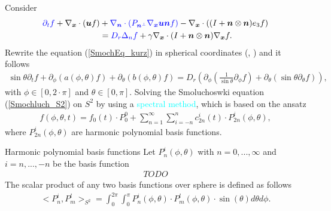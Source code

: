 \begin{frame}
	\scriptsize
	Consider 
	\begin{align}
		\textcolor{blue}{\partial_t f}+ \nabla_{\boldsymbol{x}} \cdot(\boldsymbol{u} f) & +\textcolor{blue}{\nabla_{\boldsymbol{n}} \cdot\left(P_{\boldsymbol{n}^{\perp}} \nabla_{\boldsymbol{x}} \boldsymbol{u} \boldsymbol{n} f\right)}-\nabla_{\boldsymbol{x}} \cdot\left((I+\boldsymbol{n} \otimes \boldsymbol{n}) e_3 f\right) \notag \\
		& = \textcolor{blue}{D_r \Delta_n f}+\gamma \nabla_{\boldsymbol{x}} \cdot(I+\boldsymbol{n} \otimes \boldsymbol{n}) \nabla_{\boldsymbol{x}} f. \label{SmochEq_kurz}
	\end{align}
	Rewrite the equation (\ref{SmochEq_kurz}) in spherical coordinates (\cite{zbMATH05037679}, \cite{zbMATH07295185}) and it follows
	\begin{align}
		\sin \theta \partial_t f + \partial_\phi\left(a(\phi, \theta) f\right)+\partial_\theta\left(b(\phi, \theta) f\right) = D_r \left(\partial_\phi\left(\frac{1}{\sin \theta} \partial_\phi f\right)+\partial_\theta\left(\sin \theta \partial_\theta f\right)\right), \label{Smochluch_S2}
	\end{align}
	with $\phi \in [0, 2 \cdot \pi]$ and $\theta \in [0, \pi]$.
	Solving the Smoluchoswki equation (\ref{Smochluch_S2}) on $S^2$ by using a \textcolor{cyan}{spectral method}, which is based on the ansatz
	\begin{align}
		f(\phi, \theta, t) = f_0(t) \cdot P_0^0 + \sum_{n=1}^{\infty} \sum_{i=-n}^{n} c^i_{2n}(t) \cdot P^i_{2n}(\phi, \theta), \label{ansatz}
	\end{align}
	where $P^i_{2n}(\phi, \theta)$ are harmonic polynomial basis functions. %
\end{frame}


\begin{frame}{Harmonic polynomial basis functions}
	\scriptsize
	Let ${P}^{i}_{n}(\phi, \theta)$ with $n = 0, ..., \infty$ and $i = n, ..., -n$ be the basis function
	\begin{align*}
		TODO
	\end{align*}
	The scalar product of any two basis functions over sphere is defined as follows
	\begin{align*}
		<P^i_n, P^l_m>_{S^2} = \int_{0}^{2\pi} \int_{0}^{\pi} P^{i}_{n}(\phi, \theta) \cdot P^{l}_{m}(\phi, \theta) \cdot \sin(\theta) d\theta d\phi.
	\end{align*}
\end{frame}

